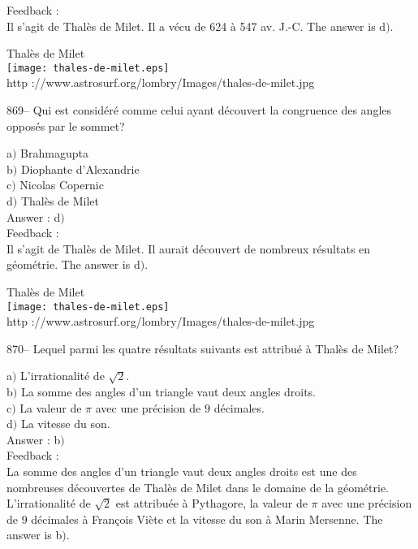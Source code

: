 \documentclass[letterpaper, 12pt]{article}
\begin{document}
Feedback :\\
Il s'agit de Thal\`es de Milet. Il a v\'ecu de 624 \`a 547 av. J.-C.
The answer is d$)$.

        \begin{center}
        Thal\`es de Milet\\
    \texttt{[image: thales-de-milet.eps]}\\
        {\footnotesize http
://www.astrosurf.org/lombry/Images/thales-de-milet.jpg}
    \end{center}

869-- Qui est consid\'er\'e comme celui ayant d\'ecouvert la
congruence des angles oppos\'es par le sommet?

a$)$ Brahmagupta \\
b$)$ Diophante d'Alexandrie \\
c$)$ Nicolas Copernic \\
d$)$ Thal\`es de Milet \\

Answer : d$)$\\

Feedback :\\
Il s'agit de Thal\`es de Milet. Il aurait d\'ecouvert de nombreux
r\'esultats en g\'eom\'etrie. The answer is d$)$.

        \begin{center}
        Thal\`es de Milet\\
    \texttt{[image: thales-de-milet.eps]}\\
        {\footnotesize http
://www.astrosurf.org/lombry/Images/thales-de-milet.jpg}
    \end{center}

870-- Lequel parmi les quatre r\'esultats suivants est attribu\'e
\`a Thal\`es de Milet?

a$)$ L'irrationalit\'e de $\sqrt2$. \\
b$)$ La somme des angles d'un triangle vaut deux angles droits. \\
c$)$ La valeur de $\pi$ avec une pr\'ecision de $9$ d\'ecimales. \\
d$)$ La vitesse du son. \\

Answer : b$)$\\

Feedback : \\
La somme des angles d'un triangle vaut deux angles droits est une
des nombreuses d\'ecouvertes de Thal\`es de Milet dans le domaine de
la g\'eom\'etrie. L'irrationalit\'e de $\sqrt2$ est attribu\'ee \`a
Pythagore, la valeur de $\pi$ avec une pr\'ecision de $9$
d\'ecimales \`a Fran\c cois Vi\`ete
et la vitesse du son \`a Marin Mersenne. The answer is b$)$.\\
\end{document}
